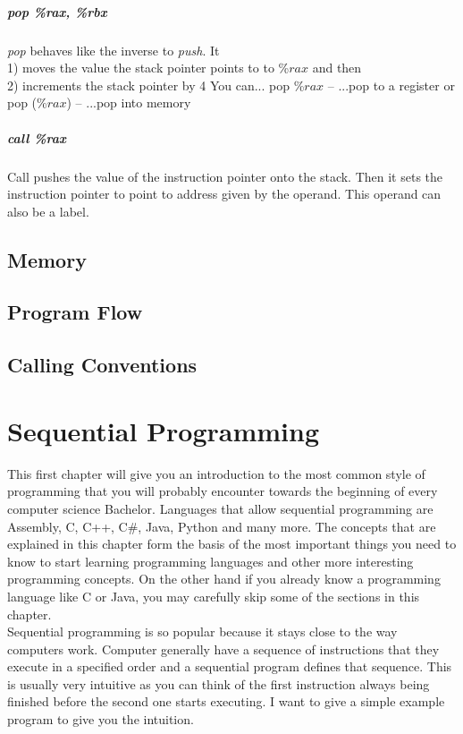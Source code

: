 \documentclass{scrreprt}
\begin{document}
\paragraph{pop \%rax, \%rbx}
\textit{pop} behaves like the inverse to \textit{push}. It \\
1) moves the value the stack pointer points to to \%$rax$ and then\\
2) increments the stack pointer by 4
You can...
pop \%$rax$ -- ...pop to a register or\\
pop (\%$rax$) -- ...pop into memory\\

\paragraph{call \%rax}
Call pushes the value of the instruction pointer onto the stack. Then it sets the instruction pointer to point to address given by the operand. This operand can also be a label.

\section{Memory}

\section{Program Flow}


\section{Calling Conventions}

\chapter{Sequential Programming}
This first chapter will give you an introduction to the most common style of programming that you will probably encounter towards the beginning of every computer science Bachelor. Languages that allow sequential programming are Assembly, C, C++, C\#, Java, Python and many more. The concepts that are explained in this chapter form the basis of the most important things you need to know to start learning programming languages and other more interesting programming concepts. On the other hand if you already know a programming language like C or Java, you may carefully skip some of the sections in this chapter. \\
Sequential programming is so popular because it stays close to the way computers work. Computer generally have a sequence of instructions that they execute in a specified order and a sequential program defines that sequence. This is usually very intuitive as you can think of the first instruction always being finished before the second one starts executing. I want to give a simple example program to give you the intuition.
\end{document}
